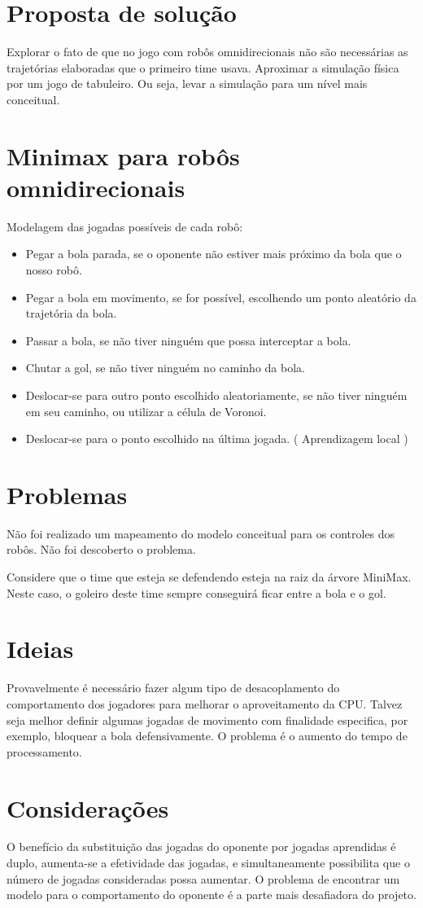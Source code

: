 \section{Proposta de solução}
Explorar o fato de que no jogo com robôs omnidirecionais não são necessárias as
trajetórias elaboradas que o primeiro time usava.
Aproximar a simulação física por um jogo de tabuleiro. Ou seja, levar a simulação para um
nível mais conceitual.

\section{Minimax para robôs omnidirecionais}
Modelagem das jogadas possíveis de cada robô:
\begin{itemize}
 \item Pegar a bola parada, se o oponente não estiver mais próximo da bola que o
 nosso robô.
 \item Pegar a bola em movimento, se for possível, escolhendo um ponto aleatório
 da trajetória da bola.
 \item Passar a bola, se não tiver ninguém que possa interceptar a bola.
 \item Chutar a gol, se não tiver ninguém no caminho da bola.
 \item Deslocar-se para outro ponto escolhido aleatoriamente, se não tiver ninguém
 em seu caminho, ou utilizar a célula de Voronoi.
 \item Deslocar-se para o ponto escolhido na última jogada. ( Aprendizagem local )
\end{itemize}

\section{Problemas}
Não foi realizado um mapeamento do modelo conceitual para os
controles dos robôs. Não foi descoberto o problema.

Considere que o time que esteja se defendendo esteja na raiz da árvore MiniMax.
Neste caso, o goleiro deste time sempre conseguirá ficar entre a bola e o gol.

\section{Ideias}
Provavelmente é necessário fazer algum tipo de desacoplamento do comportamento dos
jogadores para melhorar o aproveitamento da CPU\@.
Talvez seja melhor definir algumas jogadas de movimento com finalidade especifica,
por exemplo, bloquear a bola defensivamente. O problema é o aumento do tempo de
processamento.

\section{Considerações}
O benefício da substituição das jogadas do oponente por jogadas aprendidas é duplo,
aumenta-se a efetividade das jogadas, e simultaneamente possibilita que o
número de jogadas consideradas possa aumentar. O problema de encontrar um
modelo para o comportamento do oponente é a parte mais desafiadora do projeto.

